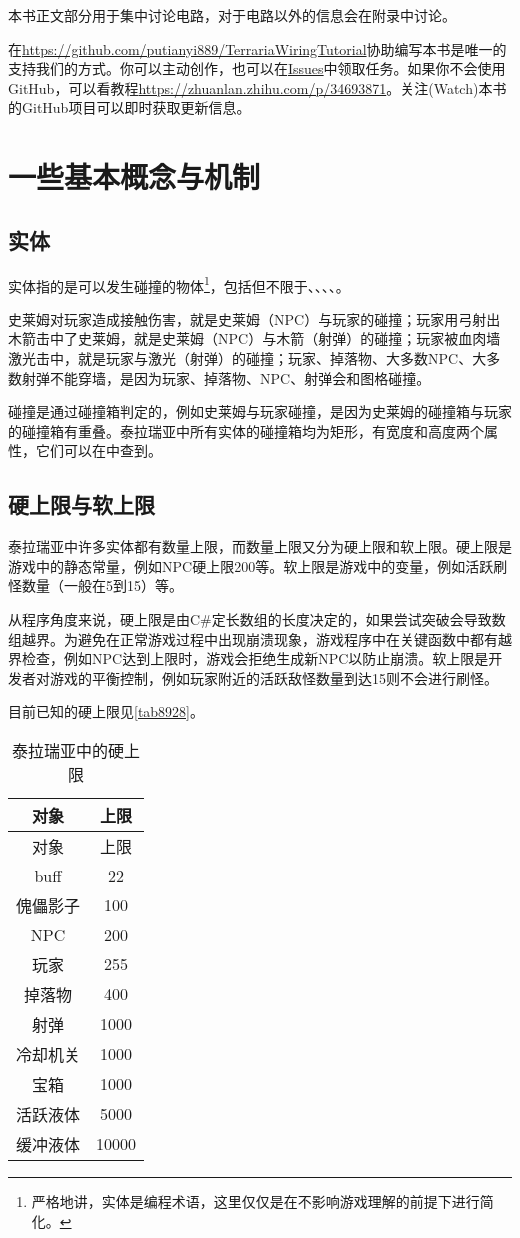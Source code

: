 本书正文部分用于集中讨论电路，对于电路以外的信息会在附录中讨论。

在\url{https://github.com/putianyi889/TerrariaWiringTutorial}协助编写本书是唯一的支持我们的方式。你可以主动创作，也可以在\href{https://github.com/putianyi889/TerrariaWiringTutorial/issues}{Issues}中领取任务。如果你不会使用GitHub，可以看教程\url{https://zhuanlan.zhihu.com/p/34693871}。关注(Watch)本书的GitHub项目可以即时获取更新信息。

\section{一些基本概念与机制}

\subsection{实体}
实体指的是可以发生碰撞的物体\footnote{严格地讲，实体是编程术语，这里仅仅是在不影响游戏理解的前提下进行简化。}，包括但不限于、、、、。

史莱姆对玩家造成接触伤害，就是史莱姆（NPC）与玩家的碰撞；玩家用弓射出木箭击中了史莱姆，就是史莱姆（NPC）与木箭（射弹）的碰撞；玩家被血肉墙激光击中，就是玩家与激光（射弹）的碰撞；玩家、掉落物、大多数NPC、大多数射弹不能穿墙，是因为玩家、掉落物、NPC、射弹会和图格碰撞。

碰撞是通过碰撞箱判定的，例如史莱姆与玩家碰撞，是因为史莱姆的碰撞箱与玩家的碰撞箱有重叠。泰拉瑞亚中所有实体的碰撞箱均为矩形，有宽度和高度两个属性，它们可以在中查到。

\subsection{硬上限与软上限}
泰拉瑞亚中许多实体都有数量上限，而数量上限又分为硬上限和软上限。硬上限是游戏中的静态常量，例如NPC硬上限200等。软上限是游戏中的变量，例如活跃刷怪数量（一般在5到15）等。

从程序角度来说，硬上限是由C\#定长数组的长度决定的，如果尝试突破会导致数组越界。为避免在正常游戏过程中出现崩溃现象，游戏程序中在关键函数中都有越界检查，例如NPC达到上限时，游戏会拒绝生成新NPC以防止崩溃。软上限是开发者对游戏的平衡控制，例如玩家附近的活跃敌怪数量到达15则不会进行刷怪。

目前已知的硬上限见\autoref{tab8928}。
\begin{longtable}{|c|c|}
\caption{泰拉瑞亚中的硬上限}\label{tab8928}\\\hline
对象&上限\\\hline
\endfirsthead
\hline 对象&上限\\\hline
\endhead
\hline
\endfoot
buff&22\\\hline
傀儡影子&100\\\hline
NPC&200\\\hline
玩家&255\\\hline
掉落物&400\\\hline
射弹&1000\\\hline
冷却机关&1000\\\hline
宝箱&1000\\\hline
活跃液体&5000\\\hline
缓冲液体&10000
\end{longtable}

